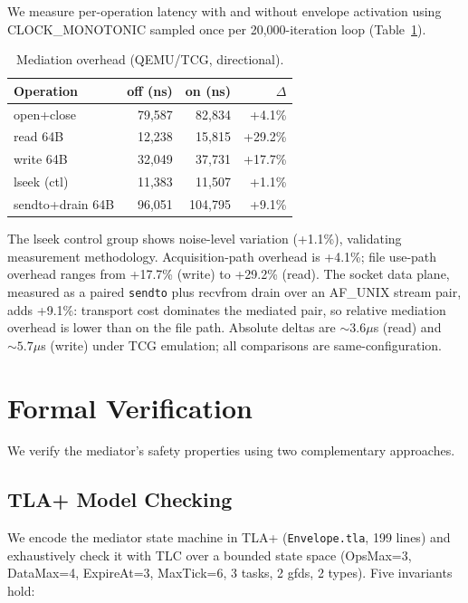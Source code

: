 \documentclass[letterpaper,twocolumn,10pt]{article}
\begin{document}
We measure per-operation latency with and without envelope activation
using CLOCK\_MONOTONIC sampled once per 20{,}000-iteration loop
(Table~\ref{tab:overhead}).

\begin{table}[t]
\centering
\caption{Mediation overhead (QEMU/TCG, directional).}
\label{tab:overhead}
\small
\begin{tabular}{lrrr}
\toprule
\textbf{Operation} & \textbf{off (ns)} & \textbf{on (ns)} & \textbf{$\Delta$} \\
\midrule
open+close & 79{,}587 & 82{,}834 & +4.1\% \\
read 64B   & 12{,}238 & 15{,}815 & +29.2\% \\
write 64B  & 32{,}049 & 37{,}731 & +17.7\% \\
lseek (ctl)& 11{,}383 & 11{,}507 & +1.1\% \\
sendto+drain 64B & 96{,}051 & 104{,}795 & +9.1\% \\
\bottomrule
\end{tabular}
\end{table}

The lseek control group shows noise-level variation (+1.1\%),
validating measurement methodology.  Acquisition-path overhead is
+4.1\%; file use-path overhead ranges from +17.7\% (write) to
+29.2\% (read).  The socket data plane, measured as a paired
\texttt{sendto} plus recvfrom drain over an AF\_UNIX stream pair,
adds +9.1\%: transport cost dominates the mediated pair, so relative
mediation overhead is lower than on the file path.  Absolute deltas
are ${\sim}3.6\mu$s (read) and ${\sim}5.7\mu$s (write) under TCG
emulation; all comparisons are same-configuration.

\section{Formal Verification}
\label{sec:formal}

We verify the mediator's safety properties using two complementary
approaches.

\subsection{TLA+ Model Checking}

We encode the mediator state machine in TLA+
(\texttt{Envelope.tla}, 199 lines) and exhaustively check it with TLC
over a bounded state space (OpsMax=3, DataMax=4, ExpireAt=3, MaxTick=6,
3 tasks, 2 gfds, 2 types).  Five invariants hold:
\end{document}
